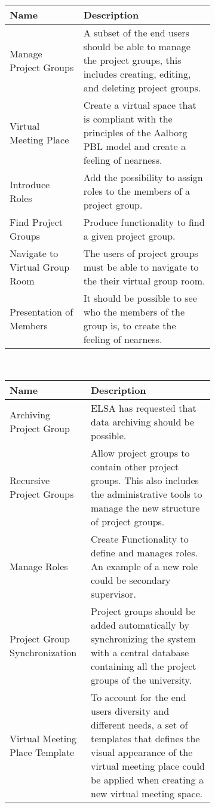 \begin{figure}%
\begin{subfigure}[b]{\textwidth}
\begin{tabular}{|p{}|p{}|}
	\hline
	\textbf{Name} & \textbf{Description} \\
	\hline
	Manage Project Groups & A subset of the end users should be able to manage the project groups, this includes creating, editing, and deleting project groups.  \\
	\hline
	Virtual Meeting Place & Create a virtual space that is compliant with the principles of the Aalborg PBL model and create a feeling of nearness.  \\
	\hline
	Introduce Roles & Add the possibility to assign roles to the members of a project group. \\
	\hline
	Find Project Groups & Produce functionality to find a given project group.\\
	\hline
	Navigate to Virtual Group Room & The users of project groups must be able to navigate to the their virtual group room. \\
	\hline
	Presentation of Members & It should be possible to see who the members of the group is, to create the feeling of nearness. \\
	\hline
	\end{tabular}\\
\end{subfigure}
	
	\vspace{10 mm}
	\begin{subfigure}[b]{\textwidth}
	\begin{tabular}{|p{}|p{}|}
	\hline
	\textbf{Name} & \textbf{Description} \\
	\hline
	Archiving Project Group & {ELSA has requested that data archiving should be possible.} \\
	\hline 
	Recursive Project Groups & {Allow project groups to contain other project groups. This also includes the administrative tools to manage the new structure of project groups.} \\
	\hline
	{Manage Roles} & {Create Functionality to define and manages roles. An example of a new role  could be secondary supervisor.} \\
	\hline
	{Project Group Synchronization} & {Project groups should be added automatically by synchronizing the system with a central database containing all the project groups of the university.}  \\
	\hline 
	Virtual Meeting Place Template & {To account for the end users diversity and different needs, a set of templates that defines the visual appearance of the virtual meeting place could be applied when creating a new virtual meeting space.}  \\
	\hline
\end{tabular}
\end{subfigure}
\label{fig:productbacklog}
\end{figure}

